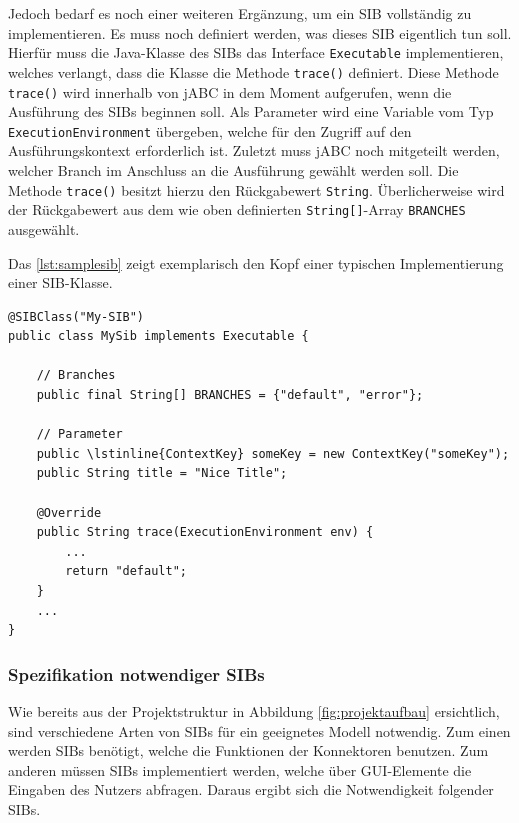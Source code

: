 Jedoch bedarf es noch einer weiteren Ergänzung, um ein SIB vollständig zu implementieren.
Es muss noch definiert werden, was dieses SIB eigentlich tun soll.
Hierfür muss die Java-Klasse des SIBs das Interface \lstinline{Executable} implementieren, welches verlangt,
 dass die Klasse die Methode \lstinline{trace()} definiert. Diese Methode \lstinline{trace()} wird innerhalb von jABC
 in dem Moment aufgerufen, wenn die Ausführung des SIBs beginnen soll.
Als Parameter wird eine Variable vom Typ \lstinline{ExecutionEnvironment} übergeben, welche für den Zugriff auf den
 Ausführungskontext erforderlich ist.
Zuletzt muss jABC noch mitgeteilt werden, welcher Branch im Anschluss an die Ausführung gewählt werden soll.
Die Methode \lstinline{trace()} besitzt hierzu den Rückgabewert \lstinline{String}.
Überlicherweise wird der Rückgabewert aus dem wie oben definierten \lstinline{String[]}-Array \lstinline{BRANCHES} ausgewählt.

Das \autoref{lst:samplesib} zeigt exemplarisch den Kopf einer typischen Implementierung einer SIB-Klasse.

\begin{lstlisting}[float=h!t]
@SIBClass("My-SIB")
public class MySib implements Executable {

	// Branches
    public final String[] BRANCHES = {"default", "error"};

    // Parameter
    public \lstinline{ContextKey} someKey = new ContextKey("someKey");
    public String title = "Nice Title";

    @Override
    public String trace(ExecutionEnvironment env) {
        ...
		return "default";
    }
	...
}
\end{lstlisting}

\FloatBarrier
\subsubsection{Spezifikation notwendiger SIBs}
\label{sec:sibs_spez}
Wie bereits aus der Projektstruktur in Abbildung \ref{fig:projektaufbau} ersichtlich, sind verschiedene Arten von SIBs
 für ein geeignetes Modell notwendig.
Zum einen werden SIBs benötigt, welche die Funktionen der Konnektoren benutzen.
Zum anderen müssen SIBs implementiert werden, welche über GUI-Elemente die Eingaben des Nutzers abfragen.
Daraus ergibt sich die Notwendigkeit folgender SIBs.

